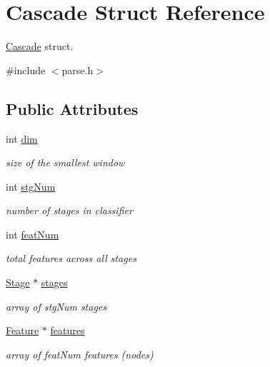 \hypertarget{structCascade}{}\section{Cascade Struct Reference}
\label{structCascade}


\hyperlink{structCascade}{Cascade} struct.  




{\ttfamily \#include $<$parse.\+h$>$}

\subsection*{Public Attributes}
\begin{DoxyCompactItemize}
\item 
int \hyperlink{structCascade_a484a13a96ae784166f514e6fe286a2ad}{dim}
\begin{DoxyCompactList}\small\item\em size of the smallest window \end{DoxyCompactList}\item 
int \hyperlink{structCascade_a4b27d7fb305d67702974f852a33ae5f8}{stg\+Num}
\begin{DoxyCompactList}\small\item\em number of stages in classifier \end{DoxyCompactList}\item 
int \hyperlink{structCascade_a71fcccb274955fbde7d5969499688c88}{feat\+Num}
\begin{DoxyCompactList}\small\item\em total features across all stages \end{DoxyCompactList}\item 
\hyperlink{structStage}{Stage} $\ast$ \hyperlink{structCascade_a65e890448add25c5ef1b8e532fb0abf0}{stages}
\begin{DoxyCompactList}\small\item\em array of stg\+Num stages \end{DoxyCompactList}\item 
\hyperlink{structFeature}{Feature} $\ast$ \hyperlink{structCascade_a07cf0273b40c3698e86e221a44950f18}{features}
\begin{DoxyCompactList}\small\item\em array of feat\+Num features (nodes) \end{DoxyCompactList}\end{DoxyCompactItemize}


